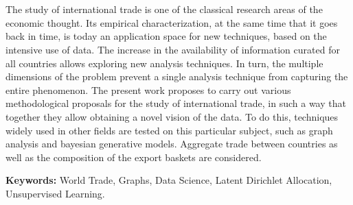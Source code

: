 \chapter*{\runtitle}

\noindent 

The study of international trade is one of the classical research areas of the economic thought. Its empirical characterization, at the same time that it goes back in time, is today an application space for new techniques, based on the intensive use of data. The increase in the availability of information curated for all countries allows exploring new analysis techniques. In turn, the multiple dimensions of the problem prevent a single analysis technique from capturing the entire phenomenon. The present work proposes to carry out various methodological proposals for the study of international trade, in such a way that together they allow obtaining a novel vision of the data. To do this, techniques widely used in other fields are tested on this particular subject, such as graph analysis and bayesian generative models.  Aggregate trade between countries as well as the composition of the export baskets are considered.

\bigskip

\noindent\textbf{Keywords:} World Trade, Graphs, Data Science, Latent Dirichlet Allocation, Unsupervised Learning.